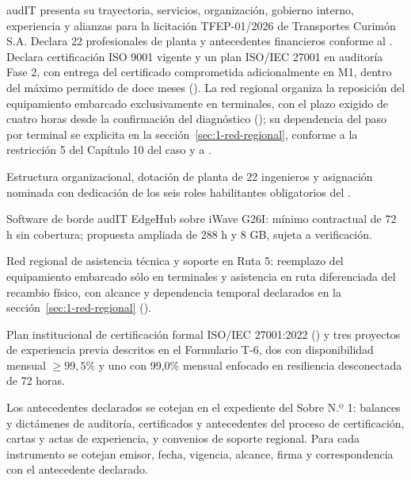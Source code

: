 
\begin{resumenApertura}
audIT presenta su trayectoria, servicios, organización, gobierno interno, experiencia y alianzas para la licitación TFEP-01/2026 de Transportes Curimón S.A. Declara 22 profesionales de planta y antecedentes financieros conforme al . Declara certificación ISO 9001 vigente y un plan ISO/IEC 27001 en auditoría Fase 2, con entrega del certificado comprometida adicionalmente en M1, dentro del máximo permitido de doce meses (). La red regional organiza la reposición del equipamiento embarcado exclusivamente en terminales, con el plazo exigido de cuatro horas desde la confirmación del diagnóstico (); su dependencia del paso por terminal se explicita en la sección~\ref{sec:1-red-regional}, conforme a la restricción 5 del Capítulo 10 del caso y a .

\begin{recibe}
  \item Estructura organizacional, dotación de planta de 22 ingenieros y asignación nominada con dedicación de los seis roles habilitantes obligatorios del .
  \item Software de borde audIT EdgeHub sobre iWave G26I: mínimo contractual de 72 h sin cobertura; propuesta ampliada de 288 h y 8 GB, sujeta a verificación.
  \item Red regional de asistencia técnica y soporte en Ruta 5: reemplazo del equipamiento embarcado sólo en terminales y asistencia en ruta diferenciada del recambio físico, con alcance y dependencia temporal declarados en la sección~\ref{sec:1-red-regional} ().
  \item Plan institucional de certificación formal ISO/IEC 27001:2022 () y tres proyectos de experiencia previa descritos en el Formulario T-6, dos con disponibilidad mensual $\ge 99{,}5\%$ y uno con 99,0\% mensual enfocado en resiliencia desconectada de 72 horas.
\end{recibe}
\end{resumenApertura}

Los antecedentes declarados se cotejan en el expediente del Sobre N.º 1: balances y dictámenes de auditoría, certificados y antecedentes del proceso de certificación, cartas y actas de experiencia, y convenios de soporte regional. Para cada instrumento se cotejan emisor, fecha, vigencia, alcance, firma y correspondencia con el antecedente declarado.

